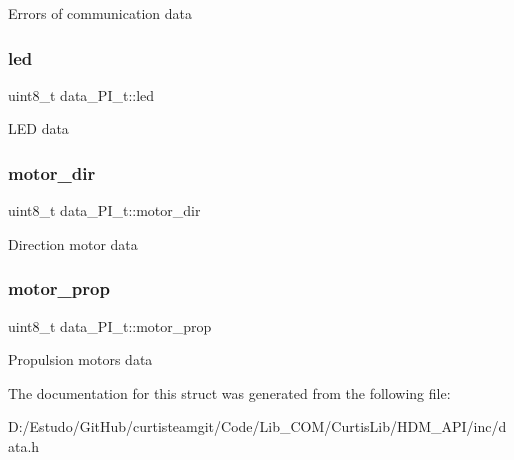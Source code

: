 Errors of communication data \hypertarget{structdata___p_i__t_ac77dbc8ab27ec005a489d7b6e44ffaba}{}\label{structdata___p_i__t_ac77dbc8ab27ec005a489d7b6e44ffaba} 
\subsubsection{\texorpdfstring{led}{led}}
{\footnotesize\ttfamily uint8\+\_\+t data\+\_\+\+P\+I\+\_\+t\+::led}

L\+ED data \hypertarget{structdata___p_i__t_a5936671e7162e117f3126a707f376283}{}\label{structdata___p_i__t_a5936671e7162e117f3126a707f376283} 
\subsubsection{\texorpdfstring{motor\+\_\+dir}{motor\_dir}}
{\footnotesize\ttfamily uint8\+\_\+t data\+\_\+\+P\+I\+\_\+t\+::motor\+\_\+dir}

Direction motor data \hypertarget{structdata___p_i__t_a6f934c30b868c2e4c5be658e9ad6038e}{}\label{structdata___p_i__t_a6f934c30b868c2e4c5be658e9ad6038e} 
\subsubsection{\texorpdfstring{motor\+\_\+prop}{motor\_prop}}
{\footnotesize\ttfamily uint8\+\_\+t data\+\_\+\+P\+I\+\_\+t\+::motor\+\_\+prop}

Propulsion motors data 

The documentation for this struct was generated from the following file\+:\begin{DoxyCompactItemize}
\item 
D\+:/\+Estudo/\+Git\+Hub/curtisteamgit/\+Code/\+Lib\+\_\+\+C\+O\+M/\+Curtis\+Lib/\+H\+D\+M\+\_\+\+A\+P\+I/inc/data.\+h\end{DoxyCompactItemize}
